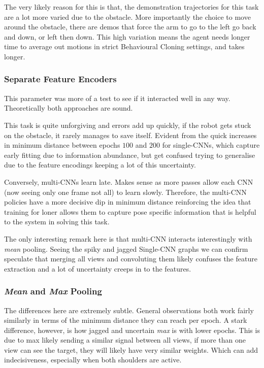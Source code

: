 The very likely reason for this is that, the demonstration trajectories for this task are a lot more varied due to the obstacle. More importantly the choice to move around the obstacle, there are demos that force the arm to go to the left go back and down, or left then down. This high variation means the agent needs longer time to average out motions in strict Behavioural Cloning settings, and takes longer.


\subsubsection{Separate Feature Encoders}
This parameter was more of a test to see if it interacted well in any way. Theoretically both approaches are sound. 

This task is quite unforgiving and errors add up quickly, if the robot gets stuck on the obstacle, it rarely manages to save itself. Evident from the quick increases in minimum distance between epochs $100$ and $200$ for single-CNNs, which capture early fitting due to information abundance, but get confused trying to generalise due to the feature encodings keeping a lot of this uncertainty.

Conversely, multi-CNNs learn late. Makes sense as more passes allow each CNN (now seeing only one frame not all) to learn slowly. Therefore, the multi-CNN policies have a more decisive dip in minimum distance reinforcing the idea that training for loner allows them to capture pose specific information that is helpful to the system in solving this task.

The only interesting remark here is that multi-CNN interacts interestingly with \emph{mean} pooling. Seeing the spiky and jagged Single-CNN graphs we can confirm speculate that merging all views and convoluting them likely confuses the feature extraction and a lot of uncertainty creeps in to the features.


\subsubsection{\emph{Mean} and \emph{Max} Pooling}
The differences here are extremely subtle. General observations both work fairly similarly in terms of the minimum distance they can reach per epoch. A stark difference, however, is how jagged and uncertain \emph{max} is with lower epochs. This is due to max likely sending a similar signal between all views, if more than one view can see the target, they will likely have very similar weights. Which can add indecisiveness, especially when both shoulders are active.

